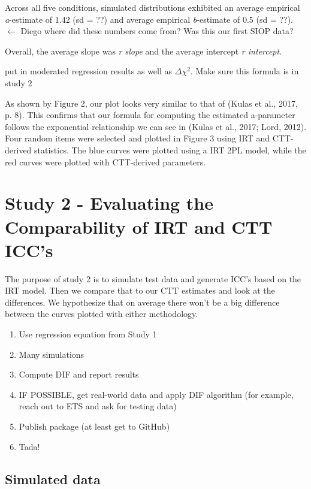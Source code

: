 \documentclass[
  man]{apa6}
\providecommand{\tightlist}{%
  \setlength{\itemsep}{0pt}\setlength{\parskip}{0pt}}
\begin{document}
Across all five conditions, simulated distributions exhibited an average empirical \emph{a}-estimate of 1.42 (sd = ??) and average empirical \emph{b}-estimate of 0.5 (sd = ??). \(\leftarrow\) Diego where did these numbers come from? Was this our first SIOP data?

Overall, the average slope was \emph{r slope} and the average intercept \emph{r intercept}.

put in moderated regression results as well as \(\Delta\)\(\chi^2\). Make sure this formula is in study 2

As shown by Figure 2, our plot looks very similar to that of (Kulas et al., 2017, p. 8). This confirms that our formula for computing the estimated a-parameter follows the exponential relationship we can see in (Kulas et al., 2017; Lord, 2012). Four random items were selected and plotted in Figure 3 using IRT and CTT-derived statistics. The blue curves were plotted using a IRT 2PL model, while the red curves were plotted with CTT-derived parameters.

\hypertarget{study-2---evaluating-the-comparability-of-irt-and-ctt-iccs}{%
\section{Study 2 - Evaluating the Comparability of IRT and CTT ICC's}\label{study-2---evaluating-the-comparability-of-irt-and-ctt-iccs}}

The purpose of study 2 is to simulate test data and generate ICC's based on the IRT model. Then we compare that to our CTT estimates and look at the differences. We hypothesize that on average there won't be a big difference between the curves plotted with either methodology.

\begin{enumerate}
\def\labelenumi{\arabic{enumi}.}
\tightlist
\item
  Use regression equation from Study 1
\item
  Many simulations
\item
  Compute DIF and report results
\item
  IF POSSIBLE, get real-world data and apply DIF algorithm (for example, reach out to ETS and ask for testing data)
\item
  Publish package (at least get to GitHub)
\item
  Tada!
\end{enumerate}

\hypertarget{simulated-data}{%
\subsection{Simulated data}\label{simulated-data}}
\end{document}
